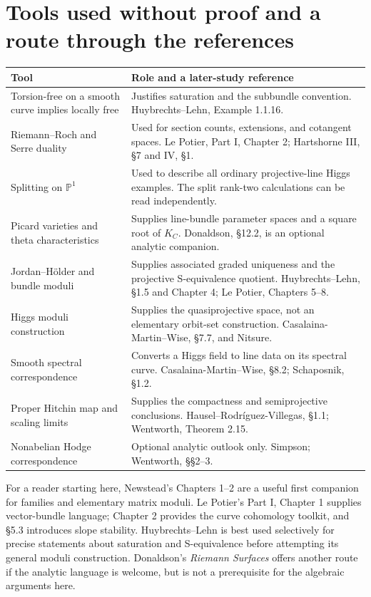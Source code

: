 \documentclass[11pt,a4paper]{article}
\numberwithin{equation}{section}
\theoremstyle{definition}
\newcommand{\PP}{\mathbb P}
\begin{document}
\appendix
\section{Tools used without proof and a route through the references}
\label{app:tools}

\begin{longtable}{@{}p{}p{}@{}}
\toprule
Tool & Role and a later-study reference\\
\midrule
\endhead
Torsion-free on a smooth curve implies locally free & Justifies saturation and the subbundle convention. Huybrechts--Lehn, Example 1.1.16.\\
Riemann--Roch and Serre duality & Used for section counts, extensions, and cotangent spaces. Le Potier, Part I, Chapter 2; Hartshorne III, \S7 and IV, \S1.\\
Splitting on $\PP^1$ & Used to describe all ordinary projective-line Higgs examples. The split rank-two calculations can be read independently.\\
Picard varieties and theta characteristics & Supplies line-bundle parameter spaces and a square root of $K_C$. Donaldson, \S12.2, is an optional analytic companion.\\
Jordan--Hölder and bundle moduli & Supplies associated graded uniqueness and the projective S-equivalence quotient. Huybrechts--Lehn, \S1.5 and Chapter 4; Le Potier, Chapters 5--8.\\
Higgs moduli construction & Supplies the quasiprojective space, not an elementary orbit-set construction. Casalaina-Martin--Wise, \S7.7, and Nitsure.\\
Smooth spectral correspondence & Converts a Higgs field to line data on its spectral curve. Casalaina-Martin--Wise, \S8.2; Schaposnik, \S1.2.\\
Proper Hitchin map and scaling limits & Supplies the compactness and semiprojective conclusions. Hausel--Rodríguez-Villegas, \S1.1; Wentworth, Theorem 2.15.\\
Nonabelian Hodge correspondence & Optional analytic outlook only. Simpson; Wentworth, \S\S2--3.\\
\bottomrule
\end{longtable}

For a reader starting here, Newstead's Chapters 1--2 are a useful
first companion for families and elementary matrix moduli. Le Potier's
Part I, Chapter 1 supplies vector-bundle language; Chapter 2 provides
the curve cohomology toolkit, and \S5.3 introduces slope stability.
Huybrechts--Lehn is best used selectively for precise statements
about saturation and S-equivalence before attempting its general
moduli construction. Donaldson's \emph{Riemann Surfaces} offers
another route if the analytic language is welcome, but is not a
prerequisite for the algebraic arguments here.
\end{document}

